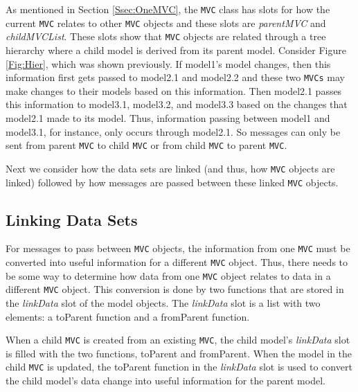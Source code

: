 \documentclass{article}[11pt]
\newcommand{\Rfunction}[1]{{\textsf{#1}}}
\newcommand{\Robject}[1]{{\texttt{#1}}}
\newcommand{\Rslot}[1]{\textsl{#1}}
\newcommand{\Rclass}[1]{\texttt{#1}}
\begin{document}
As mentioned in Section \ref{Ssec:OneMVC}, the \Rclass{MVC} class has slots
for how the current \Robject{MVC} relates to other \Robject{MVC} objects and
these slots are \Rslot{parentMVC} and \Rslot{childMVCList}.  These slots show
that \Robject{MVC} objects are related through a tree hierarchy where a child
model is derived from its parent model.  Consider Figure
\ref{Fig:Hier}, which was shown previously.  If model1's model changes, then
this information first gets passed to model2.1 and model2.2 and these two
\Robject{MVCs} may make changes to their models based on this
information.  Then model2.1 passes this information to model3.1, model3.2, and
model3.3 based on the changes that model2.1 made to its model.  Thus,
information passing between model1 and model3.1, for instance, only occurs
through model2.1.  So messages can only be sent from parent \Robject{MVC} to
child \Robject{MVC} or from child \Robject{MVC} to parent \Robject{MVC}. 

Next we consider how the data sets are linked (and thus, how \Robject{MVC}
objects are linked) followed by how messages are passed between these
linked \Robject{MVC} objects. 

\subsection{Linking Data Sets}\label{Ssec:MultLink}

For messages to pass between \Robject{MVC} objects, the information from one
\Robject{MVC} must be converted into useful information for a different
\Robject{MVC} object.  Thus, there needs to be some way to determine how data
from one \Robject{MVC} object relates to data in a different \Robject{MVC}
object.  This conversion is done by two functions that are stored in the
\Rslot{linkData} slot of the model objects.  The \Rslot{linkData}
slot is a list with two elements: a \Rfunction{toParent} function and a
\Rfunction{fromParent} function. 

When a child \Robject{MVC} is created from an existing \Robject{MVC}, the
child model's \Rslot{linkData} slot is filled with the two functions,
\Rfunction{toParent} and \Rfunction{fromParent}.  When the model in
the child \Robject{MVC} is updated, the \Rfunction{toParent} function in the
\Rslot{linkData} slot is used to convert the child model's data
change into useful information for the parent model.  
\end{document}
